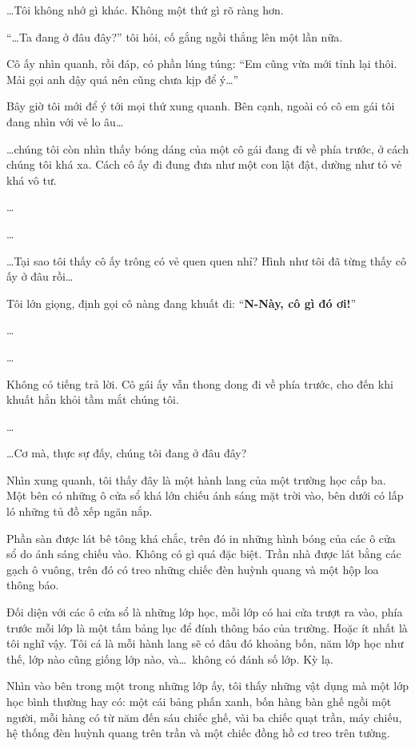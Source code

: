 \documentclass[../main.tex]{subfiles}
\begin{document}
\dots Tôi không nhớ gì khác. Không một thứ gì rõ ràng hơn.

``\dots Ta đang ở đâu đây?'' tôi hỏi, cố gắng ngồi thẳng lên một lần nữa.

Cô ấy nhìn quanh, rồi đáp, có phần lúng túng: ``Em cũng vừa mới tỉnh lại thôi. Mải gọi anh dậy quá nên cũng chưa kịp để ý\dots''

Bây giờ tôi mới để ý tới mọi thứ xung quanh. Bên cạnh, ngoài có cô em gái tôi đang nhìn với vẻ lo âu\dots


\dots chúng tôi còn nhìn thấy bóng dáng của một cô gái đang đi về phía trước, ở cách chúng tôi khá xa. Cách cô ấy đi đung đưa như một con lật đật, dường như tỏ vẻ khá vô tư.

\dots

\dots

\dots Tại sao tôi thấy cô ấy trông có vẻ quen quen nhỉ?
Hình như tôi đã từng thấy cô ấy ở đâu rồi\dots

Tôi lớn giọng, định gọi cô nàng đang khuất đi: ``\textbf{N-Này, cô gì đó ơi!}''

\dots

\dots

Không có tiếng trả lời. Cô gái ấy vẫn thong dong đi về phía trước, cho đến khi khuất hẳn khỏi tầm mắt chúng tôi.

\dots

\dots Cơ mà, thực sự đấy, chúng tôi đang ở đâu đây?

Nhìn xung quanh, tôi thấy đây là một hành lang của một trường học cấp ba. Một bên có những ô cửa sổ khá lớn chiếu ánh sáng mặt trời vào, bên dưới có lấp ló những tủ đồ xếp ngăn nắp.

Phần sàn được lát bê tông khá chắc, trên đó in những hình bóng của các ô cửa sổ do ánh sáng chiếu vào. Không có gì quá đặc biệt. Trần nhà được lát bằng các gạch ô vuông, trên đó có treo những chiếc đèn huỳnh quang và một hộp loa thông báo.

Đối diện với các ô cửa sổ là những lớp học, mỗi lớp có hai cửa trượt ra vào, phía trước mỗi lớp là một tấm bảng lục để đính thông báo của trường. Hoặc ít nhất là tôi nghĩ vậy. Tôi cá là mỗi hành lang sẽ có đâu đó khoảng bốn, năm lớp học như thế, lớp nào cũng giống lớp nào, và\dots\ không có đánh số lớp. Kỳ lạ.

Nhìn vào bên trong một trong những lớp ấy, tôi thấy những vật dụng mà một lớp học bình thường hay có: một cái bảng phấn xanh, bốn hàng bàn ghế ngồi một người, mỗi hàng có từ năm đến sáu chiếc ghế, vài ba chiếc quạt trần, máy chiếu, hệ thống đèn huỳnh quang trên trần và một chiếc đồng hồ cơ treo trên tường.
\end{document}
